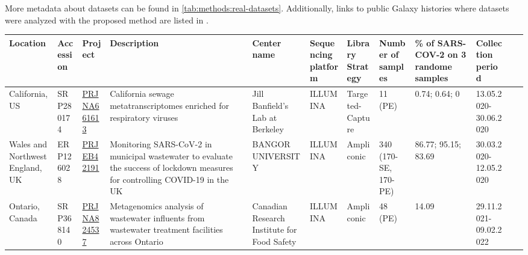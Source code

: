             More metadata about datasets can be found in \cref{tab:methods:real-datasets}. Additionally, links to public Galaxy histories where datasets were analyzed with the proposed method are listed in \label{sec:appendix:galaxy-hist}.
            \begin{landscape}
            \centering\vspace*{\fill}
                \begin{table}[ht!]
                \tiny
                \begin{tabular}{l|l|l|l|l|l|l|l|l|l|l|l}
                    \textbf{Location}&\textbf{Accession}&\textbf{Project}&\textbf{Description}&\textbf{Center name}&\multicolumn{1}{m{2cm}|}{\textbf{Sequencing platform}}&\multicolumn{1}{m{2cm}|}{\textbf{Library Strategy}}&\multicolumn{1}{m{2cm}|}{\textbf{Number of samples}}&\multicolumn{1}{m{2cm}|}{\textbf{\% of SARS-COV-2 on 3 randome samples}}&\multicolumn{1}{m{2cm}}{\textbf{Collection period}} \\
                    \hline 
                    \multicolumn{1}{m{1.5cm}|}{California, US}&SRP280174&\href{https://www.ebi.ac.uk/ena/browser/view/PRJNA661613}{PRJNA661613}&\multicolumn{1}{m{2cm}|}{California sewage metatranscriptomes enriched for respiratory viruses}&\multicolumn{1}{m{2cm}|}{Jill Banfield's Lab at Berkeley}&ILLUMINA&\multicolumn{1}{m{2cm}|}{Targeted-Capture}&11 (PE)&\multicolumn{1}{m{2cm}|}{0.74; 0.64; 0}&\multicolumn{1}{m{2cm}}{13.05.2020-30.06.2020} \\ \hline
                    \multicolumn{1}{m{1.5cm}|}{Wales and Northwest England, UK}&ERP126028&\href{https://www.ebi.ac.uk/ena/browser/view/PRJEB42191}{PRJEB42191}&\multicolumn{1}{m{2cm}|}{Monitoring SARS-CoV-2 in municipal wastewater to evaluate the success of lockdown measures for controlling COVID-19 in the UK}&\multicolumn{1}{m{2cm}|}{BANGOR UNIVERSITY}&ILLUMINA&\multicolumn{1}{m{2cm}|}{Ampliconic}&\multicolumn{1}{m{2cm}|}{340 (170-SE, 170-PE)}&\multicolumn{1}{m{2cm}|}{86.77; 95.15; 83.69}&\multicolumn{1}{m{2cm}}{30.03.2020-12.05.2020} \\\hline
                    \multicolumn{1}{m{1.5cm}|}{Ontario, Canada}&SRP368140&\href{https://www.ebi.ac.uk/ena/browser/view/PRJNA824537?show=reads}{PRJNA824537}&\multicolumn{1}{m{2cm}|}{Metagenomics analysis of wastewater influents from wastewater treatment facilities across Ontario}&\multicolumn{1}{m{2cm}|}{Canadian Research Institute for Food Safety}&ILLUMINA&\multicolumn{1}{m{2cm}|}{Ampliconic}&48 (PE)&\multicolumn{1}{m{2cm}|}{14.09}&\multicolumn{1}{m{2cm}}{29.11.2021-09.02.2022} \\\hline

\end{tabular}
\end{table}
\end{landscape}

